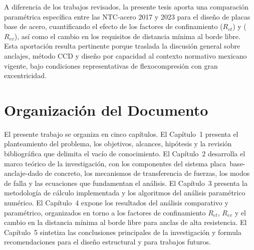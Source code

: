 A diferencia de los trabajos revisados, la presente tesis aporta una comparación paramétrica
específica entre las NTC-acero 2017 y 2023 para el diseño de placas base de acero, cuantificando el
efecto de los factores de confinamiento ($R_{et}$) y ($R_{ev}$), así como el cambio en los
requisitos de distancia mínima al borde libre. Esta aportación resulta pertinente porque traslada
la discusión general sobre anclajes, método CCD y diseño por capacidad al contexto normativo
mexicano vigente, bajo condiciones representativas de flexocompresión con gran excentricidad.

\section{Organización del Documento}

El presente trabajo se organiza en cinco capítulos. El Capítulo~1 presenta el planteamiento del
problema, los objetivos, alcances, hipótesis y la revisión bibliográfica que delimita el vacío de
conocimiento. El Capítulo~2 desarrolla el marco teórico de la investigación, con los componentes
del sistema placa~base-anclaje-dado de concreto, los mecanismos de transferencia de fuerzas, los
modos de falla y las ecuaciones que fundamentan el análisis. El Capítulo~3 presenta la metodología
de cálculo implementada y los algoritmos del análisis paramétrico numérico. El Capítulo~4 expone
los resultados del análisis comparativo y paramétrico, organizados en torno a los factores de
confinamiento $R_{et}$, $R_{ev}$ y el cambio en la distancia mínima al borde libre para anclas de
alta resistencia. El Capítulo~5 sintetiza las conclusiones principales de la investigación y
formula recomendaciones para el diseño estructural y para trabajos futuros.
